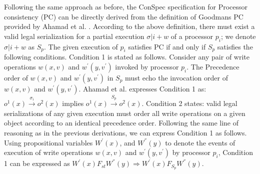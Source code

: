 \documentclass[journal,compsoc]{IEEEtran}
\begin{document}
 \par %
   Following the same approach as before, the ConSpec specification for Processor consistency (PC)  can be directly derived from the definition of Goodman\textquotesingle s PC provided by Ahamad et al. \cite{Ahamad:1993:PPC:165231.165264}.  
 According to the above definition, there must exist a valid legal serialization for a partial execution  $\sigma |i + w$ of 
 a processor $p_i$;  we denote  $\sigma |i + w$  as $S_p$.  The given execution of $p_i$ satisfies PC if and only if $S_p$ satisfies the following conditions.   
 Condition 1 is stated as follows. Consider any pair of write operations $w(x,v)$ and $w^{'}(y,v^{'})$ invoked by  processor $p_i$. The Precedence order of $w(x,v)$ and $w^{'}(y,v^{'})$  in $S_p$ must echo the invocation order of $w(x,v)$ and $w^{'}(y,v^{'})$.  Ahamad et al. expresses Condition 1 as:  
 $\mathit{o}^1(x) \xrightarrow{\sigma_i} \mathit{o}^2(x)$ implies $\mathit{o}^1(x) \xrightarrow{S_p} \mathit{o}^2(x)$. Condition 2 states:  valid legal serializations of any given execution must order all write operations on a given object according to an identical precedence order. %
  Following the same line of reasoning as in the previous derivations, we can express Condition 1 as follows.  Using propositional variables  $W^{'}(x) $, and $W^{''} (y) $ to denote the events of execution of write operations $w(x,v)$ and  $w^{'}(y,v^{'})$ by processor $p_i$, Condition 1 can be expressed as $W^{'}(x) F_\mathit{st}  W^{''} (y) \Rightarrow W^{'}(x) F_\mathit{S_p}  W^{''} (y) $. 
\end{document}
